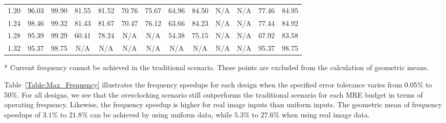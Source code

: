\documentclass[prodmode,acmtrets]{acmsmall} %
\begin{document}
\begin{table}[tbp]
{\begin{threeparttable}
\begin{tabular}{|c|cc|cc|cc|cc|cc||cc|}
     1.20 & 96.03	& 99.90   & 81.55 &	81.52 &	 70.76 &	75.67 &	 64.96 &	 84.50  &	 N/A\tnote{*}	  & N/A\tnote{*} & 77.46 & 84.95 \\
     1.24 & 98.46	& 99.32   & 81.43 &	81.67 &	 70.47 &	76.12 &	 63.66 &	 84.23  &	 N/A\tnote{*}	  & N/A\tnote{*} & 77.44 & 84.92\\
     1.28 & 95.39	& 99.29   & 60.41 &	78.24 &	 N/A\tnote{*}	    &   N/A\tnote{*}     &	54.38 &	 75.15  &	N/A\tnote{*}	  & N/A\tnote{*} & 67.92 & 83.58\\
     1.32 & 95.37	& 98.75   & N/A\tnote{*}	  &	 N/A\tnote{*}	    &	 N/A\tnote{*}	    &	 N/A\tnote{*}   & N/A\tnote{*}   & N/A\tnote{*}    &    N/A\tnote{*}   & N/A\tnote{*} & 95.37	& 98.75 \\
     \hline
   \end{tabular}
   \normalsize
   \begin{tablenotes}
   \footnotesize
    \item[*] Current frequency cannot be achieved in the traditional scenario. These points are excluded from the calculation of geometric means.
   \end{tablenotes}
   \end{threeparttable}}
   \label{Table:Ratio_MRE}
 \end{table}

Table~\ref{Table:Max_Frequency} illustrates the frequency speedups for each design when the specified error tolerance varies from 0.05\% to 50\%. For all designs, we see that the overclocking scenario still outperforms the traditional scenario for each MRE budget in terms of operating frequency. Likewise, the frequency speedup is higher for real image inputs than uniform inputs. The geometric mean of frequency speedups of $3.1\%$ to $21.8\%$ can be achieved by using uniform data, while $5.3\%$ to $27.6\%$ when using real image data.
\end{document}
